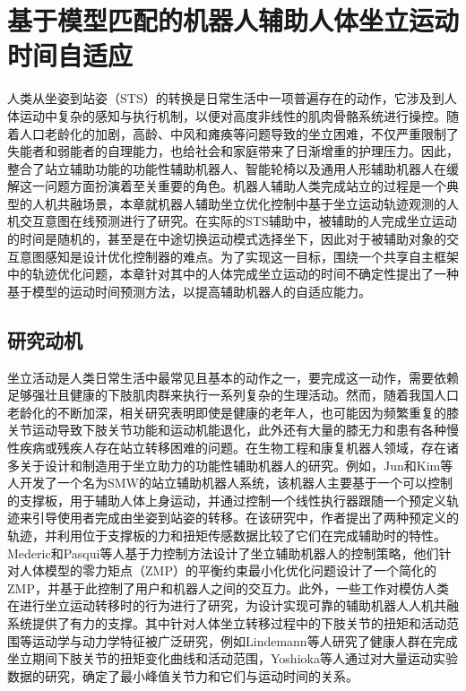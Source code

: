 \chapter{基于模型匹配的机器人辅助人体坐立运动时间自适应}
人类从坐姿到站姿（STS）的转换是日常生活中一项普遍存在的动作，它涉及到人体运动中复杂的感知与执行机制，以便对高度非线性的肌肉骨骼系统进行操控。随着人口老龄化的加剧，高龄、中风和瘫痪等问题导致的坐立困难，不仅严重限制了失能者和弱能者的自理能力，也给社会和家庭带来了日渐增重的护理压力。因此，整合了站立辅助功能的功能性辅助机器人、智能轮椅以及通用人形辅助机器人在缓解这一问题方面扮演着至关重要的角色。机器人辅助人类完成站立的过程是一个典型的人机共融场景，本章就机器人辅助坐立优化控制中基于坐立运动轨迹观测的人机交互意图在线预测进行了研究。在实际的STS辅助中，被辅助的人完成坐立运动的时间是随机的，甚至是在中途切换运动模式选择坐下，因此对于被辅助对象的交互意图感知是设计优化控制器的难点。为了实现这一目标，围绕一个共享自主框架中的轨迹优化问题，本章针对其中的人体完成坐立运动的时间不确定性提出了一种基于模型的运动时间预测方法，以提高辅助机器人的自适应能力。
\section{研究动机}
坐立活动是人类日常生活中最常见且基本的动作之一，要完成这一动作，需要依赖足够强壮且健康的下肢肌肉群来执行一系列复杂的生理活动。然而，随着我国人口老龄化的不断加深，相关研究表明即使是健康的老年人，也可能因为频繁重复的膝关节运动导致下肢关节功能和运动机能退化\cite{heidariKneeOsteoarthritisPrevalence2011}，此外还有大量的膝无力和患有各种慢性疾病或残疾人存在站立转移困难的问题。在生物工程和康复机器人领域，存在诸多关于设计和制造用于坐立助力的功能性辅助机器人的研究。例如，Jun和Kim等人\cite{hong-guljunWalkingSittostandSupport2011,inhokimKinematicAnalysisSittostand2011}开发了一个名为SMW的站立辅助机器人系统，该机器人主要基于一个可以控制的支撑板，用于辅助人体上身运动，并通过控制一个线性执行器跟随一个预定义轨迹来引导使用者完成由坐姿到站姿的转移。在该研究中，作者提出了两种预定义的轨迹，并利用位于支撑板的力和扭矩传感数据比较了它们在完成辅助时的特性。Mederic和Pasqui等人\cite{medericElderlyPeopleSit2006}基于力控制方法设计了坐立辅助机器人的控制策略，他们针对人体模型的零力矩点（ZMP）的平衡约束最小化优化问题设计了一个简化的ZMP，并基于此控制了用户和机器人之间的交互力。此外，一些工作对模仿人类在进行坐立运动转移时的行为进行了研究，为设计实现可靠的辅助机器人人机共融系统提供了有力的支撑。其中针对人体坐立转移过程中的下肢关节的扭矩和活动范围等运动学与动力学特征被广泛研究，例如Lindemann等人\cite{galliQuantitativeAnalysisSit2008}研究了健康人群在完成坐立期间下肢关节的扭矩变化曲线和活动范围，Yoshioka等人\cite{yoshiokaBiomechanicalAnalysisRelation2009}通过对大量运动实验数据的研究，确定了最小峰值关节力和它们与运动时间的关系。


